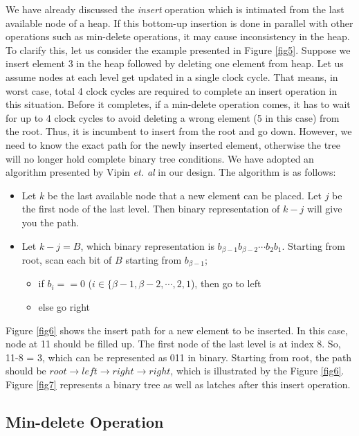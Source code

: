 \documentclass[10pt, conference, compsocconf]{IEEEtran}
\begin{document}
We have already discussed the {\it insert} operation which is intimated from the last available node of a heap.
If this bottom-up insertion is done in parallel with other operations such as min-delete operations, it may cause inconsistency in the heap.
To clarify this, let us consider the example presented in Figure \ref{fig5}.
Suppose we insert element 3 in the heap followed by deleting one element from heap.
Let us assume nodes at each level get updated in a single clock cycle.
That means, in worst case, total 4 clock cycles are required to complete an insert operation in this situation.
Before it completes, if a min-delete operation comes, it has to wait for up to 4 clock cycles to avoid deleting a wrong element (5 in this case) from the root.
Thus, it is incumbent to insert from the root and go down.
However, we need to know the exact path for the newly inserted element, otherwise the tree will no longer hold complete binary tree conditions.
We have adopted an algorithm presented by Vipin {\it et. al} \cite{pq6} in our design. The algorithm is as follows:

\begin{itemize}
\item Let $k$ be the last available node that a new element can be placed. Let $j$ be the first node of the last level. Then binary representation of $k-j$ will give you the path.
\item Let $k-j = B$, which binary representation is $b_{\beta-1}b_{\beta-2} \cdots b_2b_1$. Starting from root, scan each bit of $B$ starting from $b_{\beta-1}$;
    \begin{itemize}
    \item if $b_i == 0$ ($i \in \{\beta-1,\beta-2, \cdots, 2,1$), then go to left
    \item else go right
    \end{itemize}
\end{itemize}

Figure \ref{fig6} shows the insert path for a new element to be inserted. In this case, node at 11 should be filled up.
The first node of the last level is at index 8.
So, 11-8 = 3, which can be represented as 011 in binary.
Starting from root, the path should be $root \rightarrow left \rightarrow right \rightarrow right$, which is illustrated by the Figure \ref{fig6}. Figure \ref{fig7} represents a binary tree as well as latches after this insert operation.

\subsection{Min-delete Operation}
\end{document}
